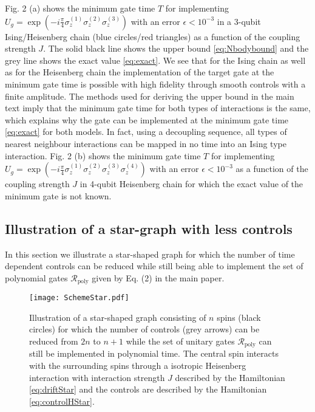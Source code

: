 \documentclass[aps,twocolumn,amsmath,amssymb,nofootinbib,superscriptaddress]{revtex4-1}
\begin{document}
 Fig. 2 (a) shows the minimum gate time $T$ for implementing $U_{g}=\exp(-i\frac{\pi}{4}\sigma_{z}^{(1)}\sigma_{z}^{(2)}\sigma_{z}^{(3)})$ with an error $\epsilon<10^{-3}$ in a 3-qubit Ising/Heisenberg chain (blue circles/red triangles) as a function of the coupling strength $J$. The solid black line shows the upper bound \eqref{eq:Nbodybound} and the grey line shows the exact value \eqref{eq:exact}. We see that for the Ising chain as well as for the Heisenberg chain the implementation of the target gate at the minimum gate time is possible with high fidelity through smooth controls with a finite amplitude. The methods \cite{DecLloyd} used for deriving the upper bound in the main text imply that the minimum gate time for both types of interactions is the same, which explains why the gate can be implemented at the minimum gate time \eqref{eq:exact} for both models. In fact, using a decoupling sequence, all types of nearest neighbour interactions can be mapped in no time into an Ising type interaction. Fig. 2 (b) shows the minimum gate time $T$ for implementing $U_{g}=\exp(-i\frac{\pi}{4}\sigma_{z}^{(1)}\sigma_{z}^{(2)}\sigma_{z}^{(3)}\sigma_{z}^{(4)})$ with an error $\epsilon<10^{-3}$ as a function of the coupling strength $J$ in 4-qubit Heisenberg chain for which the exact value of the minimum gate is not known.
      
\subsection*{Illustration of a star-graph with less controls}
In this section we illustrate a star-shaped graph for which the number of time dependent controls can be reduced while still being able to implement the set of polynomial gates $\mathcal R_{\text{poly}}$ given by Eq. (2) in the main paper. 


  \begin{figure}[h]
  \texttt{[image: SchemeStar.pdf]}
 \caption{Illustration of a star-shaped graph consisting of $n$ spins (black circles) for which the number of controls (grey arrows) can be reduced from $2n$ to $n+1$ while the set of unitary gates $\mathcal R_{\text{poly}}$ can still be implemented in polynomial time. The central spin interacts with the surrounding spins through a isotropic Heisenberg interaction with interaction strength $J$ described by the Hamiltonian \eqref{eq:driftStar} and the controls are described by the Hamiltonian \eqref{eq:controlHStar}.}
\end{figure}
\end{document}
